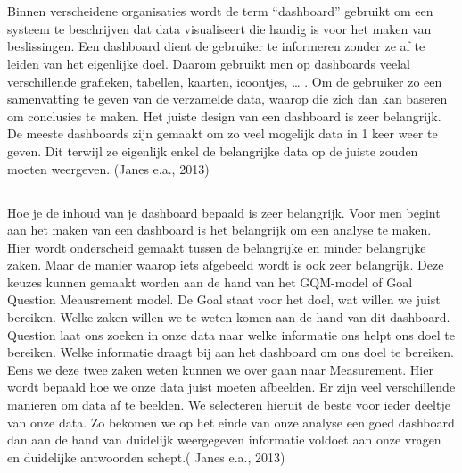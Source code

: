 \chapter{}%
\label{ch:stand-van-zaken}



Binnen verscheidene organisaties wordt de term “dashboard” gebruikt om een systeem te beschrijven dat data visualiseert die handig is voor het maken van beslissingen. Een dashboard dient de gebruiker te informeren zonder ze af te leiden van het eigenlijke doel. Daarom gebruikt men op dashboards veelal verschillende grafieken, tabellen, kaarten, icoontjes, … . Om de gebruiker zo een samenvatting te geven van de verzamelde data, waarop die zich dan kan baseren om conclusies te maken. Het juiste design van een dashboard is zeer belangrijk. De meeste dashboards zijn gemaakt om zo veel mogelijk data in 1 keer weer te geven. Dit terwijl ze eigenlijk enkel de belangrijke data op de juiste zouden moeten weergeven. (Janes e.a., 2013)

\section{}%
\label{sec:inhoudDashboardBepalen}
Hoe je de inhoud van je dashboard bepaald is zeer belangrijk. Voor men begint aan het maken van een dashboard is het belangrijk om een analyse te maken. Hier wordt onderscheid gemaakt tussen de belangrijke en minder belangrijke zaken. Maar de manier waarop iets afgebeeld wordt is ook zeer belangrijk. Deze keuzes kunnen gemaakt worden aan de hand van het GQM-model of Goal Question Meausrement model. De Goal staat voor het doel, wat willen we juist bereiken. Welke zaken willen we te weten komen aan de hand van dit dashboard. Question laat ons zoeken in onze data naar welke informatie ons helpt ons doel te bereiken. Welke informatie draagt bij aan het dashboard om ons doel te bereiken. Eens we deze twee zaken weten kunnen we over gaan naar Measurement. Hier wordt bepaald hoe we onze data juist moeten afbeelden. Er zijn veel verschillende manieren om data af te beelden. We selecteren hieruit de beste voor ieder deeltje van onze data. Zo bekomen we op het einde van onze analyse een goed dashboard dan aan de hand van duidelijk weergegeven informatie voldoet aan onze vragen en duidelijke antwoorden schept.( Janes e.a., 2013)

